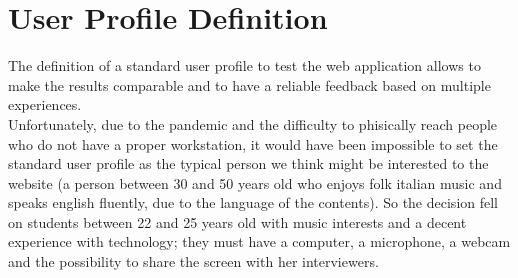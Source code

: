\documentclass[../../UsabilityReport.tex]{subfiles}
\begin{document}
\section{User Profile Definition}
	The definition of a standard user profile to test the web application allows to make the results comparable and to have a reliable feedback based on multiple experiences.\\
	Unfortunately, due to the pandemic and the difficulty to phisically reach people who do not have a proper workstation, it would have been impossible to set the standard user profile as the typical person we think might be interested to the website (a person between 30 and 50 years old who enjoys folk italian music and speaks english fluently, due to the language of the contents). So the decision fell on students between 22 and 25 years old with music interests and a decent experience with technology; they must have a computer, a microphone, a webcam and the possibility to share the screen with her interviewers.
\end{document}
